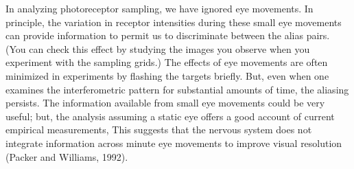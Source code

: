 In analyzing photoreceptor sampling, we have ignored
eye movements.
In principle, the variation in receptor intensities
during these small eye movements can provide
information to permit us to discriminate between the alias pairs.
(You can check this effect by studying the images you observe when you
experiment with the sampling grids.)
The effects of eye movements are often minimized in experiments
by flashing the targets briefly.
But, even when one examines the interferometric pattern for
substantial amounts of time, the aliasing persists.
The information available from small eye movements
could be very useful;
but, the analysis assuming
a static eye offers a good account
of current empirical measurements,
This suggests that the nervous system does not integrate
information across minute eye movements
to improve visual resolution (Packer and Williams, 1992).
\nocite{PackerWilliamsVR1992v32}

